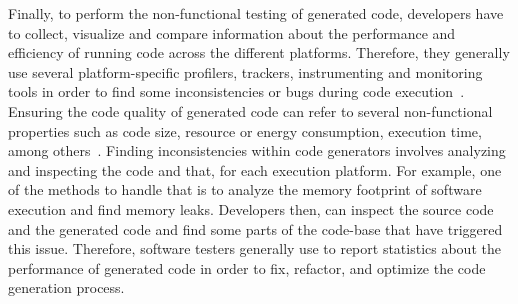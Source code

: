 Finally, to perform the non-functional testing of generated code, developers have to collect, visualize and compare information about the performance and efficiency of running code across the different platforms. 
Therefore, they generally use several platform-specific profilers, trackers, instrumenting and monitoring tools in order to find some inconsistencies or bugs during code execution~\cite{guana2014chaintracker,delgado2004taxonomy}. Ensuring the code quality of generated code can refer to several non-functional properties such as code size, resource or energy consumption, execution time, among others~\cite{pan2006fast}. Finding inconsistencies within code generators involves analyzing and inspecting the code and that, for each execution platform. For example, one of the methods to handle that is to analyze the memory footprint of software execution and find memory leaks. Developers then, can inspect the source code and the generated code and find some parts of the code-base that have triggered this issue. %
Therefore, software testers generally use to report statistics about the performance of generated code in order to fix, refactor, and optimize the code generation process.




 




\iffalse 
//footprint
//It is also possible to automatically generate test suites for software artfacts 
//model coverage
//System resources and architecture of each execution platform might vary 
//talk about platform specific profilers
//heterogeneous execution platforms
//the need of system level abstraction/virtualization to handle heterogeneity
//ease the monitoring process 
//add figure of SOTA 
\fi




